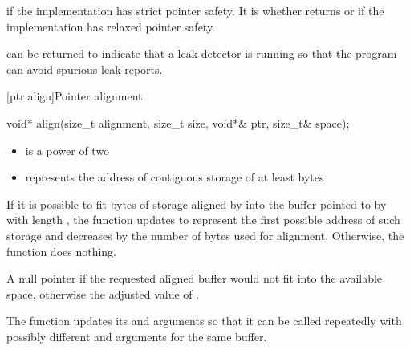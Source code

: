 \begin{itemdescr}
\pnum
\returns
{} if the implementation has strict pointer
safety. It is
whether
 returns  or
 if the implementation has relaxed pointer
safety.
\begin{footnote}
 can be returned to indicate
that a leak detector is running so that the program can avoid spurious leak
reports.
\end{footnote}
\end{itemdescr}


[ptr.align]{Pointer alignment}

%
\begin{itemdecl}
void* align(size_t alignment, size_t size, void*& ptr, size_t& space);
\end{itemdecl}

\begin{itemdescr}
\pnum
\expects
\begin{itemize}
\item
{} is a power of two

\item
{} represents the address of contiguous storage of at least
 bytes
\end{itemize}

\pnum
\effects
If it is possible to fit  bytes
of storage aligned by  into the buffer pointed to by
 with length , the function updates
 to represent the first possible address of such storage
and decreases  by the number of bytes used for alignment.
Otherwise, the function does nothing.

\pnum
\returns
A null pointer if the requested aligned buffer
would not fit into the available space, otherwise the adjusted value
of .

\pnum
\begin{note}
The function updates its 
and  arguments so that it can be called repeatedly
with possibly different  and 
arguments for the same buffer.
\end{note}
\end{itemdescr}

